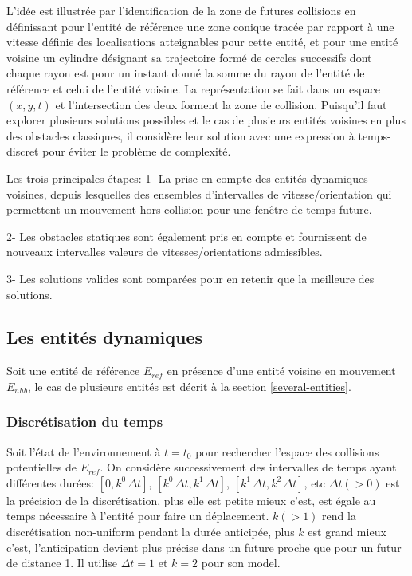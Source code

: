 \documentclass[11pt]{article}
\begin{document}
L'idée est illustrée par l'identification de la zone de futures collisions en définissant pour l'entité de référence une zone conique tracée par rapport à une vitesse définie des localisations atteignables pour cette entité, et pour une entité voisine un cylindre désignant sa trajectoire formé de cercles successifs dont chaque rayon est pour un instant donné la somme du rayon de l'entité de référence et celui de l'entité voisine. La représentation se fait dans un espace $(x, y, t)$ et l'intersection des deux forment la zone de collision. Puisqu'il faut explorer plusieurs solutions possibles et le cas de plusieurs entités voisines en plus des obstacles classiques, il considère leur solution avec une expression à temps-discret pour éviter le problème de complexité.

Les trois principales étapes:
1- La prise en compte des entités dynamiques voisines, depuis lesquelles des ensembles d'intervalles de vitesse/orientation qui permettent un mouvement hors collision pour une fenêtre de temps future.

2- Les obstacles statiques sont également pris en compte et fournissent de nouveaux intervalles valeurs de vitesses/orientations admissibles.

3- Les solutions valides sont comparées pour en retenir que la meilleure des solutions.

\subsection{Les entités dynamiques}

Soit une entité de référence $E_{ref}$ en présence d'une entité voisine en mouvement $E_{nhb}$, le cas de plusieurs entités est décrit à la section \ref{several-entities}.

\subsubsection*{Discrétisation du temps}

Soit l'état de l'environnement à $t = t_0$ pour rechercher l'espace des collisions potentielles de $E_{ref}$. On considère successivement des intervalles de temps  ayant différentes durées: $[0, k^0\, \Delta t]$, $[k^0\, \Delta t, k^1\, \Delta t]$, $[k^1\, \Delta t, k^2\, \Delta t]$, etc
$\Delta t (> 0)$ est la précision de la discrétisation, plus elle est petite mieux c'est, est égale au temps nécessaire à l'entité pour faire un déplacement.
$k (> 1)$ rend la discrétisation non-uniform pendant la durée anticipée, plus $k$ est grand mieux c'est, l'anticipation devient plus précise dans un future proche que pour un futur de distance 1.
Il utilise $\Delta t = 1$ et $k = 2$ pour son model.
\end{document}
